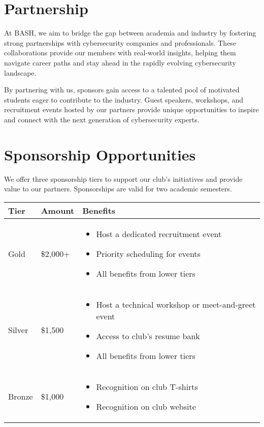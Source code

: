 \documentclass[11pt,letterpaper]{article}
\begin{document}
\section*{Partnership}
At BASH, we aim to bridge the gap between academia and industry by fostering strong partnerships with cybersecurity companies and professionals. These collaborations provide our members with real-world insights, helping them navigate career paths and stay ahead in the rapidly evolving cybersecurity landscape.

By partnering with us, sponsors gain access to a talented pool of motivated students eager to contribute to the industry. Guest speakers, workshops, and recruitment events hosted by our partners provide unique opportunities to inspire and connect with the next generation of cybersecurity experts.

\section*{Sponsorship Opportunities}
We offer three sponsorship tiers to support our club's initiatives and provide value to our partners. Sponsorships are valid for two academic semesters.

\begin{table}[h]
    \centering
    \begin{tabular}{p{2cm}p{3cm}p{8cm}}
        \toprule
        \textbf{Tier} & \textbf{Amount} & \textbf{Benefits} \\
        \midrule
        Gold & \$2,000+ & 
        \begin{itemize}[leftmargin=*,nosep]
            \item Host a dedicated recruitment event
            \item Priority scheduling for events
            \item All benefits from lower tiers
        \end{itemize} \\
        Silver & \$1,500 & 
        \begin{itemize}[leftmargin=*,nosep]
            \item Host a technical workshop or meet-and-greet event
            \item Access to club's resume bank
            \item All benefits from lower tiers
        \end{itemize} \\
        Bronze & \$1,000 & 
        \begin{itemize}[leftmargin=*,nosep]
            \item Recognition on club T-shirts
            \item Recognition on club website
        \end{itemize} \\
        \bottomrule
    \end{tabular}
\end{table}
\end{document}
